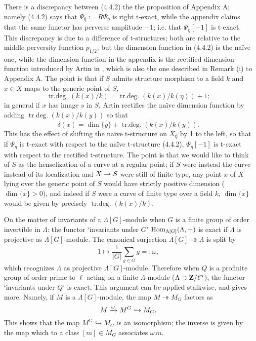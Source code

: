 \documentclass[deligne.tex]{subfiles}
\begin{document}
There is a discrepancy between (4.4.2) the the proposition of Appendix A;
namely (4.4.2) says that $\Psi_{\overline\eta}:=R\Psi_{\overline\eta}$ is
right t-exact, while the appendix claims that the same functor has perverse
amplitude $-1$; i.e. that $\Psi_{\overline\eta}[-1]$ is t-exact.
This discrepancy is due to a difference of t-structures; both are relative
to the middle perversity function $p_{1/2}$, but the dimension function
in (4.4.2) is the naïve one, while the dimension function in the appendix
is the rectified dimension function introduced by Artin in
\cite[XIV 2.2]{SGAA}, which is also the one described in Remark (i) to
Appendix A. The point is that if $S$ admits structure morphism to a field
$k$ and $x\in X$ maps to the generic point of $S$,
\begin{equation*}
	\operatorname{tr. deg.}(k(x)/k)=\operatorname{tr. deg.}(k(x)/k(\eta))+1;
\end{equation*}
in general if $x$ has image $s$ in $S$, Artin rectifies the naïve dimension
function by adding $\operatorname{tr. deg.}(k(x)/k(y))$ so that
\begin{equation*}
	\delta(x)=\dim\overline{\{y\}}+\operatorname{tr. deg.}(k(x)/k(y)).
\end{equation*}
This has the effect of shifting the naïve t-structure on
$X_{\overline\eta}$ by 1 to the left, so that if $\Psi_{\overline\eta}$ is
t-exact with respect to the naïve t-structure (4.4.2),
$\Psi_{\overline\eta}[-1]$ is t-exact with respect to the rectified
t-structure. The point is that we would like to think of $S$ as the
henselization of a curve at a regular point; if $S$ were instead the curve
instead of its localization and $X\rightarrow S$ were still of finite type, any
point $x$ of $X$ lying over the generic point of $S$ would have strictly
positive dimension ($\dim\overline{\{x\}}>0$), and indeed if $S$ were a
curve of finite type over a field $k$, $\dim\overline{\{x\}}$ would be
given by precisely $\operatorname{tr. deg.}(k(x)/k)$.

On the matter of invariants of a $\Lambda[G]$-module when $G$ is a finite
group of order invertible in $\Lambda$: the functor `invariants under $G$'
$\operatorname{Hom}_{\Lambda[G]}(\Lambda,-)$
is exact if $\Lambda$ is projective as $\Lambda[G]$-module. The canonical
surjection $\Lambda[G]\twoheadrightarrow\Lambda$ is split by
\begin{equation*}
	1\mapsto\frac1{|G|}\sum_{g\in G}g=:\omega,
\end{equation*}
which recognizes $\Lambda$ as projective $\Lambda[G]$-module.
Therefore when $Q$ is a profinite group of order prime to $\ell$ acting on
a finite $\Lambda$-module ($\Lambda\supset\mathbf{Z}/\ell^n$), the functor
`invariants under $Q$' is exact.
This argument can be applied stalkwise, and gives more.
Namely, if $M$ is a $\Lambda[G]$-module, the map
$M\twoheadrightarrow M_G$ factors as
\begin{equation*}
	M\xrightarrow{\omega}M^G\hookrightarrow M_G.
\end{equation*}
This shows that the map $M^G\hookrightarrow M_G$ is an isomorphism; the
inverse is given by the map which to a class $[m]\in M_G$ associates
$\omega\, m$.
\end{document}
